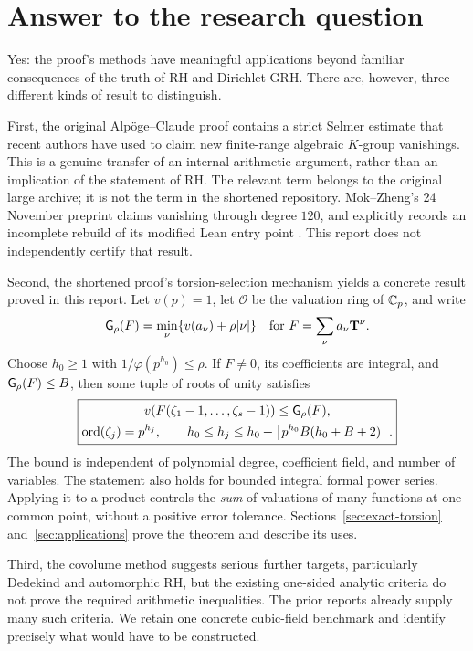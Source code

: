 \section{Answer to the research question}
\label{sec:assessment}

Yes: the proof's methods have meaningful applications beyond familiar
consequences of the truth of RH and Dirichlet GRH. There are, however, three
different kinds of result to distinguish.

First, the original Alp\"oge--Claude proof contains a strict Selmer estimate
that recent authors have used to claim new finite-range algebraic
\(K\)-group vanishings. This is a genuine transfer of an internal arithmetic
argument, rather than an implication of the statement of RH. The relevant
term belongs to the original large archive; it is not the
 term in the shortened repository.
Mok--Zheng's 24 November preprint claims vanishing through degree \(120\),
and explicitly records an incomplete rebuild of its modified Lean entry
point \cite{mokzheng}. This report does not independently certify that result.

Second, the shortened proof's torsion-selection mechanism yields a concrete
result proved in this report. Let \(v(p)=1\), let \(\mathcal O\) be the
valuation ring of \(\mathbb C_p\), and write
\[
 \mathsf G_\rho(F)=\min_\nu\{v(a_\nu)+\rho|\nu|\}
 \quad\text{for }F=\sum_\nu a_\nu \mathbf T^\nu.
\]
Choose \(h_0\ge1\) with \(1/\varphi(p^{h_0})\le\rho\).
If \(F\ne0\), its coefficients are integral, and
\(\mathsf G_\rho(F)\le B\), then some tuple of roots of unity satisfies
\[
 \boxed{\begin{gathered}
 v(F(\zeta_1-1,\ldots,\zeta_s-1))\le\mathsf G_\rho(F),\\
 \operatorname{ord}(\zeta_j)=p^{h_j},\qquad
 h_0\le h_j\le h_0+\left\lceil p^{h_0}B(h_0+B+2)\right\rceil.
 \end{gathered}}
\]
The bound is independent of polynomial
degree, coefficient field, and number of variables. The statement also
holds for bounded integral formal power series. Applying it to a product
controls the \emph{sum} of valuations of many functions at one common point,
without a positive error tolerance. Sections~\ref{sec:exact-torsion}
and~\ref{sec:applications} prove the theorem and describe its uses.

Third, the covolume method suggests serious further targets, particularly
Dedekind and automorphic RH, but the existing one-sided analytic criteria
do not prove the required arithmetic inequalities. The prior reports already
supply many such criteria. We retain one concrete cubic-field benchmark and
identify precisely what would have to be constructed.

